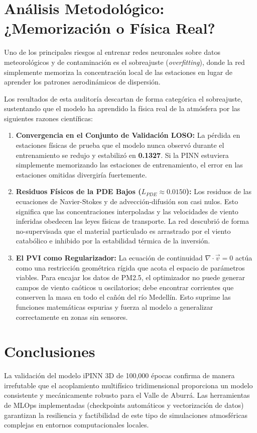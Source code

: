 \documentclass[11pt,letterpaper]{article}
\begin{document}
\section{Análisis Metodológico: ¿Memorización o Física Real?}
Uno de los principales riesgos al entrenar redes neuronales sobre datos meteorológicos y de contaminación es el sobreajuste (\textit{overfitting}), donde la red simplemente memoriza la concentración local de las estaciones en lugar de aprender los patrones aerodinámicos de dispersión.

Los resultados de esta auditoría descartan de forma categórica el sobreajuste, sustentando que el modelo ha aprendido la física real de la atmósfera por las siguientes razones científicas:

\begin{enumerate}
    \item \textbf{Convergencia en el Conjunto de Validación LOSO:} La pérdida en estaciones físicas de prueba que el modelo nunca observó durante el entrenamiento se redujo y estabilizó en \textbf{0.1327}. Si la PINN estuviera simplemente memorizando las estaciones de entrenamiento, el error en las estaciones omitidas divergiría fuertemente.
    \item \textbf{Residuos Físicos de la PDE Bajos ($L_{PDE} \approx 0.0150$):} Los residuos de las ecuaciones de Navier-Stokes y de advección-difusión son casi nulos. Esto significa que las concentraciones interpoladas y las velocidades de viento inferidas obedecen las leyes físicas de transporte. La red descubrió de forma no-supervisada que el material particulado es arrastrado por el viento catabólico e inhibido por la estabilidad térmica de la inversión.
    \item \textbf{El PVI como Regularizador:} La ecuación de continuidad $\nabla \cdot \vec{v} = 0$ actúa como una restricción geométrica rígida que acota el espacio de parámetros viables. Para encajar los datos de PM2.5, el optimizador no puede generar campos de viento caóticos u oscilatorios; debe encontrar corrientes que conserven la masa en todo el cañón del río Medellín. Esto suprime las funciones matemáticas espurias y fuerza al modelo a generalizar correctamente en zonas sin sensores.
\end{enumerate}

\section{Conclusiones}
La validación del modelo iPINN 3D de 100,000 épocas confirma de manera irrefutable que el acoplamiento multifísico tridimensional proporciona un modelo consistente y mecánicamente robusto para el Valle de Aburrá. Las herramientas de MLOps implementadas (checkpoints automáticos y vectorización de datos) garantizan la resiliencia y factibilidad de este tipo de simulaciones atmosféricas complejas en entornos computacionales locales.
\end{document}
